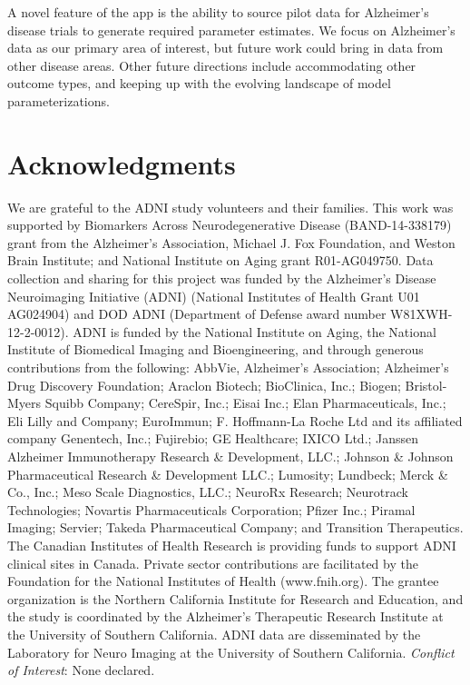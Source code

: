 A novel feature of the app is the ability to source pilot data for Alzheimer's disease trials to generate required parameter estimates. We focus on Alzheimer's data as our primary area of interest, but future work could bring in data from other disease areas. Other future directions include accommodating other outcome types, and keeping up with the evolving landscape of model parameterizations. 

\section*{Acknowledgments}
We are grateful to the ADNI study volunteers and their families. This work was supported by Biomarkers Across Neurodegenerative Disease (BAND-14-338179) grant from the Alzheimer's Association, Michael J. Fox Foundation, and Weston Brain Institute; and National Institute on Aging grant R01-AG049750. Data collection and sharing for this project was funded by the Alzheimer's Disease Neuroimaging Initiative (ADNI) (National Institutes of Health Grant U01 AG024904) and DOD ADNI (Department of Defense award number W81XWH-12-2-0012). ADNI is funded by the National Institute on Aging, the National Institute of Biomedical Imaging and Bioengineering, and through generous contributions from the following: AbbVie, Alzheimer's Association; Alzheimer's Drug Discovery Foundation; Araclon Biotech; BioClinica, Inc.; Biogen; Bristol-Myers Squibb Company; CereSpir, Inc.; Eisai Inc.; Elan Pharmaceuticals, Inc.; Eli Lilly and Company; EuroImmun; F. Hoffmann-La Roche Ltd and its affiliated company Genentech, Inc.; Fujirebio; GE Healthcare; IXICO Ltd.; Janssen Alzheimer Immunotherapy Research \& Development, LLC.; Johnson \& Johnson Pharmaceutical Research \& Development LLC.; Lumosity; Lundbeck; Merck \& Co., Inc.; Meso Scale Diagnostics, LLC.; NeuroRx Research; Neurotrack Technologies; Novartis Pharmaceuticals Corporation; Pfizer Inc.; Piramal Imaging; Servier; Takeda Pharmaceutical Company; and Transition Therapeutics. The Canadian Institutes of Health Research is providing funds to support ADNI clinical sites in Canada. Private sector contributions are facilitated by the Foundation for the National Institutes of Health (www.fnih.org). The grantee organization is the Northern California Institute for Research and Education, and the study is coordinated by the Alzheimer's Therapeutic Research Institute at the University of Southern California. ADNI data are disseminated by the Laboratory for Neuro Imaging at the University of Southern California.
{\it Conflict of Interest}: None declared.

